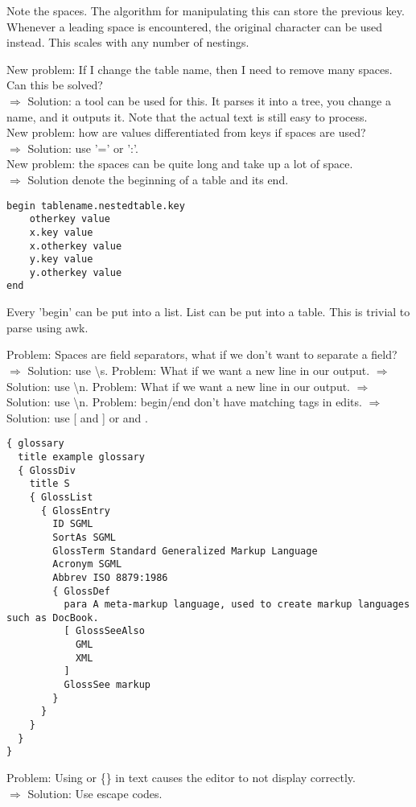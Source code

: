 \documentclass[listof=totoc]{article}
\begin{document}
Note the spaces. The algorithm for manipulating this can store the previous key. Whenever a leading space is
encountered, the original character can be used instead. This scales with any number of nestings.

New problem: If I change the table name, then I need to remove many spaces. Can this be solved?\\
$\Rightarrow$ Solution: a tool can be used for this. It parses it into a tree, you change a name, and it outputs it. Note that the actual text is still easy to process.\\
New problem: how are values differentiated from keys if spaces are used?\\
$\Rightarrow$ Solution: use '=' or ':'.\\
New problem: the spaces can be quite long and take up a lot of space.\\
$\Rightarrow$ Solution denote the beginning of a table and its end.\\

\begin{verbatim}
begin tablename.nestedtable.key
	otherkey value
	x.key value
	x.otherkey value
	y.key value
	y.otherkey value
end
\end{verbatim}

Every 'begin' can be put into a list. List can be put into a table.
This is trivial to parse using awk.

Problem: Spaces are field separators, what if we don't want to separate a field?\\
$\Rightarrow$ Solution: use \textbackslash s.
Problem: What if we want a new line in our output.
$\Rightarrow$ Solution: use \textbackslash n.
Problem: What if we want a new line in our output.
$\Rightarrow$ Solution: use \textbackslash n.
Problem: begin/end don't have matching tags in edits.
$\Rightarrow$ Solution: use [ and ] or { and }.

\begin{verbatim}
{ glossary
  title example glossary
  { GlossDiv
    title S
    { GlossList
      { GlossEntry
        ID SGML
        SortAs SGML
        GlossTerm Standard Generalized Markup Language
        Acronym SGML
        Abbrev ISO 8879:1986
        { GlossDef
          para A meta-markup language, used to create markup languages such as DocBook.
          [ GlossSeeAlso
            GML
            XML
          ]
          GlossSee markup
        }
      }
    }
  }
}
\end{verbatim}

Problem: Using \lbrack \rbrack or \{\} in text causes the editor to not display correctly.\\
$\Rightarrow$ Solution: Use escape codes.
\end{document}

